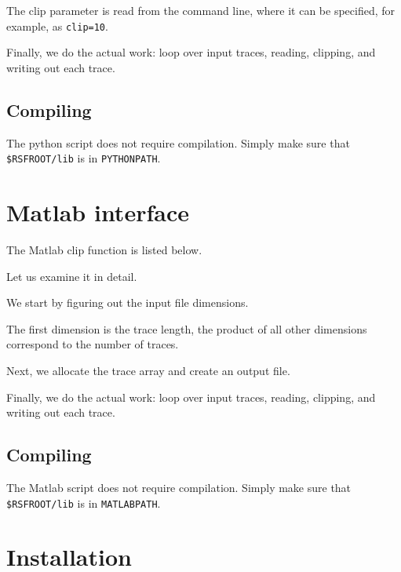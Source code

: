 
The clip parameter is read from the command line, where it can be specified,
for example, as \texttt{clip=10}.


Finally, we do the actual work: loop over input traces, reading, clipping, and
writing out each trace.

\subsection{Compiling}

The python script does not require compilation. Simply make sure that
\texttt{\$RSFROOT/lib} is in \texttt{PYTHONPATH}. 

\section{Matlab interface}

\lstset{language=matlab}

The Matlab clip function is listed below.



Let us examine it in detail. 


We start by figuring out the input file dimensions.


The first dimension is the trace length, the product of all other
dimensions correspond to the number of traces.


Next, we allocate the trace array and create an output file.


Finally, we do the actual work: loop over input traces, reading, clipping, and
writing out each trace.

\subsection{Compiling}

The Matlab script does not require compilation. Simply make sure that
\texttt{\$RSFROOT/lib} is in \texttt{MATLABPATH}.

\section{Installation} 

